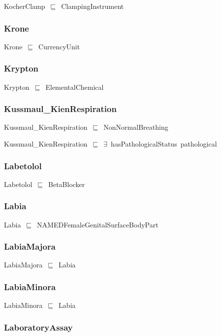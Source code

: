 \documentclass{article}
\begin{document}
KocherClamp~\ensuremath{\sqsubseteq}~ClampingInstrument~

\subsubsection*{Krone}

Krone~\ensuremath{\sqsubseteq}~CurrencyUnit~

\subsubsection*{Krypton}

Krypton~\ensuremath{\sqsubseteq}~ElementalChemical~

\subsubsection*{Kussmaul_KienRespiration}

Kussmaul\_KienRespiration~\ensuremath{\sqsubseteq}~NonNormalBreathing~

Kussmaul\_KienRespiration~\ensuremath{\sqsubseteq}~\ensuremath{\exists}~hasPathologicalStatus~pathological~

\subsubsection*{Labetolol}

Labetolol~\ensuremath{\sqsubseteq}~BetaBlocker~

\subsubsection*{Labia}

Labia~\ensuremath{\sqsubseteq}~NAMEDFemaleGenitalSurfaceBodyPart~

\subsubsection*{LabiaMajora}

LabiaMajora~\ensuremath{\sqsubseteq}~Labia~

\subsubsection*{LabiaMinora}

LabiaMinora~\ensuremath{\sqsubseteq}~Labia~

\subsubsection*{LaboratoryAssay}
\end{document}
